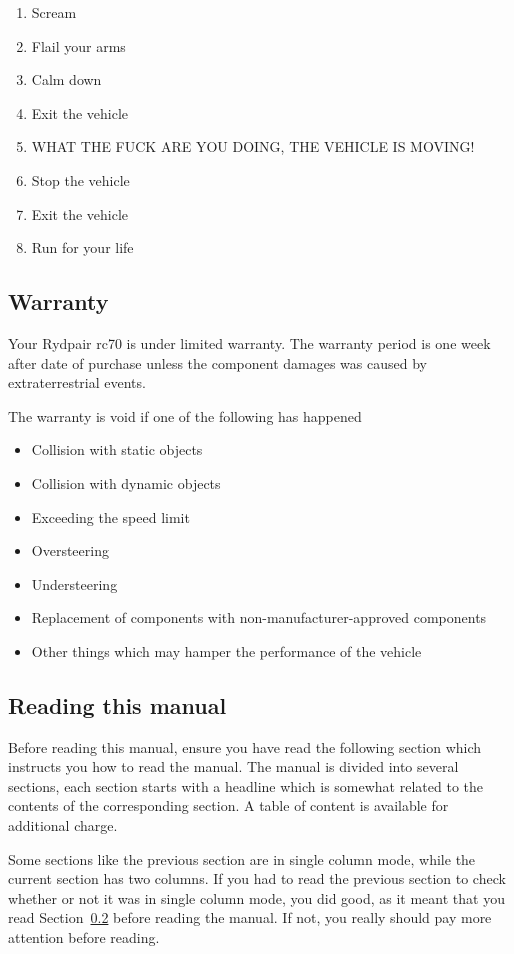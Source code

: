 \documentclass{article}
\newcommand{\carbrand}{Rydpair}
\newcommand{\carmodel}{rc70}
\begin{document}
    \begin{enumerate}
        \item{Scream}
        \item{Flail your arms}
        \item{Calm down}
        \item{Exit the vehicle}
        \item{WHAT THE FUCK ARE YOU DOING, THE VEHICLE IS MOVING!}
        \item{Stop the vehicle}
        \item{Exit the vehicle}
        \item{Run for your life}
    \end{enumerate}


    \subsection{Warranty}

    Your \carbrand{} \carmodel{} is under limited warranty. The warranty period is
    one week after date of purchase unless the component damages was caused by
    extraterrestrial events.

    The warranty is void if one of the following has happened
    \begin{itemize}
        \item{Collision with static objects}
        \item{Collision with dynamic objects}
        \item{Exceeding the speed limit}
        \item{Oversteering}
        \item{Understeering}
        \item{Replacement of components with non-manufacturer-approved components}
        \item{Other things which may hamper the performance of the vehicle}
    \end{itemize}

    \twocolumn

    \subsection{Reading this manual}\label{sec:reading_the_manual}

    Before reading this manual, ensure you have read the following section which
    instructs you how to read the manual. The manual is divided into several
    sections, each section starts with a headline which is somewhat related to
    the contents of the corresponding section. A table of content is available
    for additional charge.

    Some sections like the previous section are in single column mode, while the
    current section has two columns. If you had to read the previous section to check
    whether or not it was in single column mode, you did good, as it meant that you
    read Section~\ref{sec:reading_the_manual} before reading the manual. If not,
    you really should pay more attention before reading.

    \onecolumn
\end{document}

